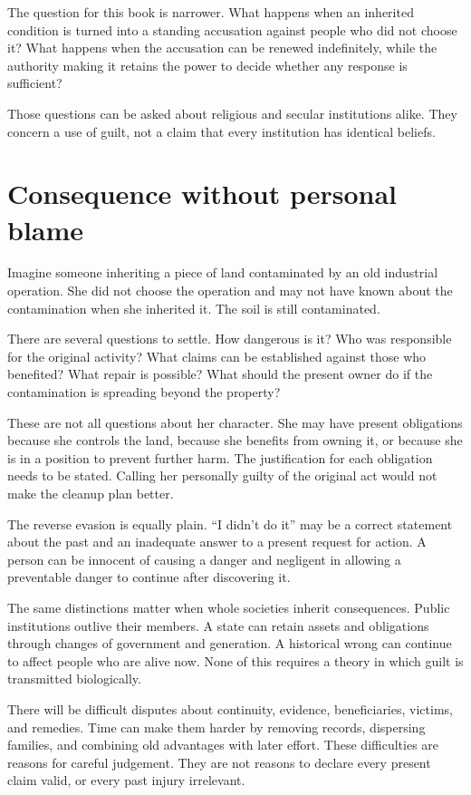 \documentclass[12pt,a4paper]{book}
\begin{document}
The question for this book is narrower. What happens when an inherited condition is turned into a standing accusation against people who did not choose it? What happens when the accusation can be renewed indefinitely, while the authority making it retains the power to decide whether any response is sufficient?

Those questions can be asked about religious and secular institutions alike. They concern a use of guilt, not a claim that every institution has identical beliefs.

\section*{Consequence without personal blame}

Imagine someone inheriting a piece of land contaminated by an old industrial operation. She did not choose the operation and may not have known about the contamination when she inherited it. The soil is still contaminated.

There are several questions to settle. How dangerous is it? Who was responsible for the original activity? What claims can be established against those who benefited? What repair is possible? What should the present owner do if the contamination is spreading beyond the property?

These are not all questions about her character. She may have present obligations because she controls the land, because she benefits from owning it, or because she is in a position to prevent further harm. The justification for each obligation needs to be stated. Calling her personally guilty of the original act would not make the cleanup plan better.

The reverse evasion is equally plain. ``I didn't do it'' may be a correct statement about the past and an inadequate answer to a present request for action. A person can be innocent of causing a danger and negligent in allowing a preventable danger to continue after discovering it.

The same distinctions matter when whole societies inherit consequences. Public institutions outlive their members. A state can retain assets and obligations through changes of government and generation. A historical wrong can continue to affect people who are alive now. None of this requires a theory in which guilt is transmitted biologically.

There will be difficult disputes about continuity, evidence, beneficiaries, victims, and remedies. Time can make them harder by removing records, dispersing families, and combining old advantages with later effort. These difficulties are reasons for careful judgement. They are not reasons to declare every present claim valid, or every past injury irrelevant.
\end{document}
